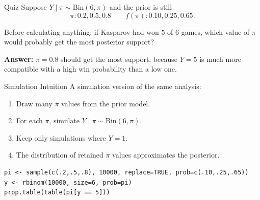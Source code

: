 \documentclass[12pt]{beamer}
\begin{document}
\begin{frame}{}
\begin{block}{Quiz}
Suppose $Y\mid\pi\sim\text{Bin}(6,\pi)$ and the prior is still
\[
\pi: 0.2,0.5,0.8 \qquad f(\pi): 0.10,0.25,0.65.
\]

Before calculating anything: if Kasparov had won $5$ of $6$ games, which value of $\pi$ would probably get the most posterior support?

\vspace{0.4cm}
\pause
\textbf{Answer:}
$\pi=0.8$ should get the most support, because $Y=5$ is much more compatible with a high win probability than a low one.
\end{block}
\end{frame}

\begin{frame}[fragile]{}
\begin{block}{Simulation Intuition}
A simulation version of the same analysis:
\begin{enumerate}
\item Draw many $\pi$ values from the prior model.
\item For each $\pi$, simulate $Y\mid\pi \sim \text{Bin}(6,\pi)$.
\item Keep only simulations where $Y=1$.
\item The distribution of retained $\pi$ values approximates the posterior.
\end{enumerate}

\vspace{0.4cm}
\begin{verbatim}
pi <- sample(c(.2,.5,.8), 10000, replace=TRUE, prob=c(.10,.25,.65))
y <- rbinom(10000, size=6, prob=pi)
prop.table(table(pi[y == 5]))
\end{verbatim}

\end{block}
\end{frame}
\end{document}
